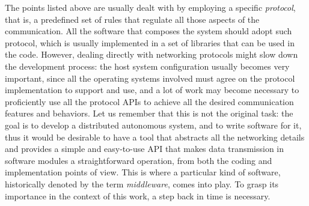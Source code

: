 The points listed above are usually dealt with by employing a specific \emph{protocol}, that is, a predefined set of rules that regulate all those aspects of the communication. All the software that composes the system should adopt such protocol, which is usually implemented in a set of libraries that can be used in the code. However, dealing directly with networking protocols might slow down the development process: the host system configuration usually becomes very important, since all the operating systems involved must agree on the protocol implementation to support and use, and a lot of work may become necessary to proficiently use all the protocol APIs to achieve all the desired communication features and behaviors. Let us remember that this is not the original task: the goal is to develop a distributed autonomous system, and to write software for it, thus it would be desirable to have a tool that abstracts all the networking details and provides a simple and easy-to-use API that makes data transmission in software modules a straightforward operation, from both the coding and implementation points of view. This is where a particular kind of software, historically denoted by the term \emph{middleware}, comes into play. To grasp its importance in the context of this work, a step back in time is necessary.

